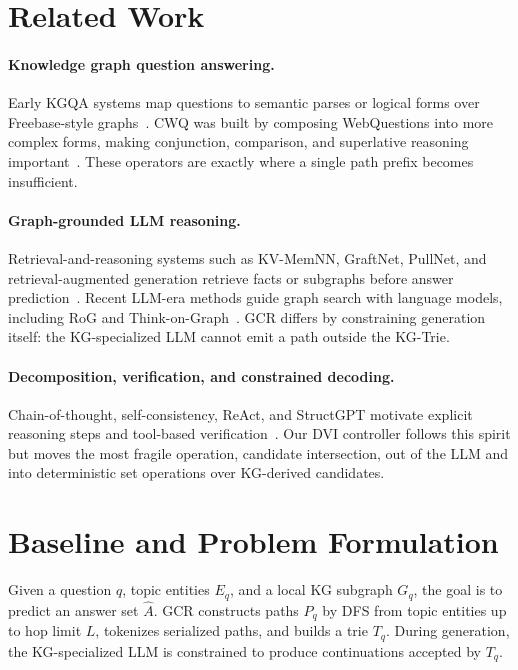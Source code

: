\documentclass[10pt,twocolumn]{article}
\begin{document}
\section{Related Work}
\paragraph{Knowledge graph question answering.}
Early KGQA systems map questions to semantic parses or logical forms over Freebase-style graphs~\cite{berant2013semantic,yih2016webqsp}. CWQ was built by composing WebQuestions into more complex forms, making conjunction, comparison, and superlative reasoning important~\cite{talmor2018cwq}. These operators are exactly where a single path prefix becomes insufficient.

\paragraph{Graph-grounded LLM reasoning.}
Retrieval-and-reasoning systems such as KV-MemNN, GraftNet, PullNet, and retrieval-augmented generation retrieve facts or subgraphs before answer prediction~\cite{miller2016kvmem,sun2018graftnet,sun2019pullnet,lewis2020rag}. Recent LLM-era methods guide graph search with language models, including RoG and Think-on-Graph~\cite{luo2024rog,sun2023tog}. GCR differs by constraining generation itself: the KG-specialized LLM cannot emit a path outside the KG-Trie.

\paragraph{Decomposition, verification, and constrained decoding.}
Chain-of-thought, self-consistency, ReAct, and StructGPT motivate explicit reasoning steps and tool-based verification~\cite{wei2022cot,wang2023selfconsistency,yao2023react,jiang2023structgpt}. Our DVI controller follows this spirit but moves the most fragile operation, candidate intersection, out of the LLM and into deterministic set operations over KG-derived candidates.

\section{Baseline and Problem Formulation}
Given a question $q$, topic entities $E_q$, and a local KG subgraph $G_q$, the goal is to predict an answer set $\hat{A}$. GCR constructs paths $P_q$ by DFS from topic entities up to hop limit $L$, tokenizes serialized paths, and builds a trie $T_q$. During generation, the KG-specialized LLM is constrained to produce continuations accepted by $T_q$.
\end{document}
